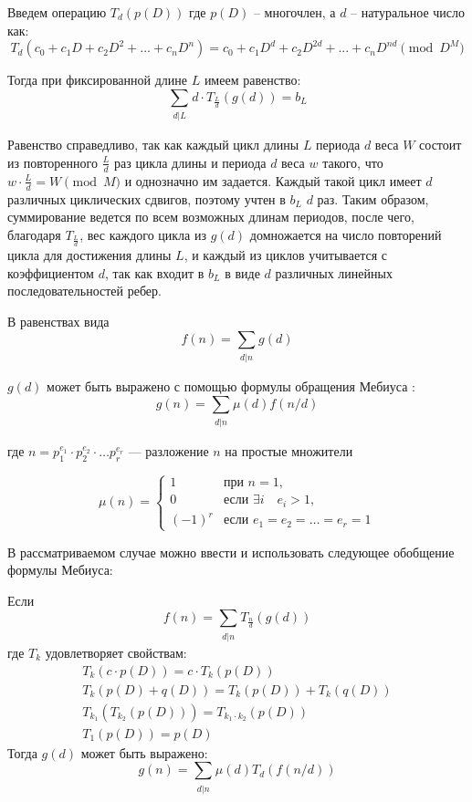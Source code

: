 \begin{definition} \label{def1}
Введем операцию $T_d(p(D))$ где $p(D)$ -- многочлен, а $d$ -- натуральное число как:
\[
  T_d(c_0+c_1D+c_2D^2+...+c_nD^n) = c_0+c_1D^{d}+c_2D^{2d}+...+c_nD^{nd} \pmod{D^M}
\]
\end{definition}

Тогда при фиксированной длине $L$ имеем равенство:
\[
  \sum_{\substack{d | L}}d \cdot T_{\frac{L}{d}}(g(d)) = b_L \label{eqWithT}
\]

Равенство справедливо, так как каждый цикл длины $L$ периода $d$ веса $W$ состоит из повторенного $\frac{L}{d}$ раз
цикла длины и периода $d$ веса $w$ такого, что $w\cdot \frac{L}{d} = W \pmod M$ и однозначно им задается.
Каждый такой цикл имеет $d$ различных циклических сдвигов, поэтому учтен в $b_L$ $d$ раз.
Таким образом, суммирование ведется по всем возможных длинам периодов, после чего, благодаря $T_{\frac{L}{d}}$,
вес каждого цикла из $g(d)$ домножается на число повторений цикла для достижения длины $L$, и каждый
из циклов учитывается с коэффициентом $d$, так как входит в $b_L$ в виде $d$ различных линейных 
последовательностей ребер.

В равенствах вида
\[
  f(n)=\sum_{\substack{d|n}}g(d)
\]

$g(d)$ может быть выражено с помощью формулы обращения Мебиуса \cite{hall-combinatorics}:
\[
  g(n) = \sum_{\substack{d|n}}\mu(d)f(n/d)
\]

где $n = p_1^{e_1} \cdot p_2^{e_2} \cdot \ldots p_r^{e_r}$ --- разложение $n$ на простые множители

\[
  \mu(n)=
\left\{
  \begin{array}{lll}
    1 & \mbox{при } n=1, \\
    0 & \mbox{если } \exists i \quad e_i > 1, \\
    (-1)^r & \mbox{если } e_1 = e_2 = \ldots = e_r = 1
  \end{array}
\right.
\]

В рассматриваемом случае можно ввести и использовать следующее обобщение формулы Мебиуса:

\begin{theorem} \label{th1}
Если
\[
  f(n) = \sum_{\substack{d|n}}T_{\frac{n}{d}}(g(d))
\]
где $T_{k}$ удовлетворяет свойствам:
\begin{eqnarray}
T_k(c \cdot p(D)) = c \cdot T_k(p(D)) \label{eq1}\\
T_k(p(D)+q(D)) = T_k(p(D))+T_k(q(D))\label{eq2}\\
T_{k_1}(T_{k_2}(p(D))) = T_{k_1\cdot k_2}(p(D)) \label{eq3}\\
T_1(p(D)) = p(D) \label{eq4}\
\end{eqnarray}
Тогда $g(d)$ может быть выражено:
\[
  g(n) = \sum_{\substack{d|n}}\mu(d)T_d(f(n/d))
\]
\end{theorem}

